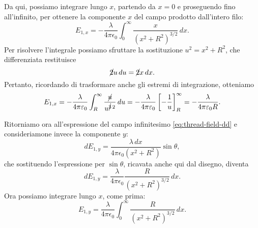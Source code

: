 \documentclass[10pt]{gulartcl}
\begin{document}
\begin{solution}
Da qui, possiamo integrare lungo $x$, partendo da $x = 0$ e proseguendo
fino all’infinito, per ottenere la componente $x$ del campo prodotto
dall’intero filo:
\begin{equation}
    E_{1,x} = -\frac{\lambda}{4 \pi \epsilon_0} \int_{0}^{\infty}
    \frac{x}{(x^{2} + R^{2})^{3/2}}\, dx.
\end{equation}
Per risolvere l’integrale possiamo sfruttare la sostituzione $u^2 = x^2 +
R^2$, che differenziata restituisce
\begin{equation}
    \cancel{2}u \, du = \cancel{2}x \, dx.
\end{equation}
Pertanto, ricordando di trasformare anche gli estremi di integrazione,
otteniamo
\begin{equation}
    E_{1,x} = - \frac{\lambda}{4 \pi \epsilon_0} \int_{R}^{\infty}
    \frac{\cancel{u}}{u^{\cancel{3}\, 2}} \, du = - \frac{\lambda}{4 \pi
    \epsilon_0} \left[-\frac{1}{u}\right]_{R}^{\infty} = -
    \frac{\lambda}{4\pi\epsilon_0 R}.
\end{equation}

Ritorniamo ora all’espressione del campo infinitesimo
\eqref{eq:thread-field-dd} e consideriamone invece la componente $y$:
\begin{equation}
    dE_{1,y} = \frac{\lambda\, dx}{4\pi\epsilon_0 (x^{2} + R^{2})}
    \sin\theta,
\end{equation}
che sostituendo l’espressione per $\sin\theta$, ricavata anche qui dal
disegno, diventa
\begin{equation}
    dE_{1,y} = \frac{\lambda}{4\pi\epsilon_0} \frac{R}{(x^{2} +
    R^{2})^{3/2}}\, dx.
\end{equation}
Ora possiamo integrare lungo $x$, come prima:
\begin{equation}
    E_{1,y} = \frac{\lambda}{4\pi\epsilon_0} \int_{0}^{\infty}
    \frac{R}{(x^{2} + R^{2})^{3/2}} \, dx.
    \label{eq:thread-field-ey}
\end{equation}


\end{solution}
\end{document}
